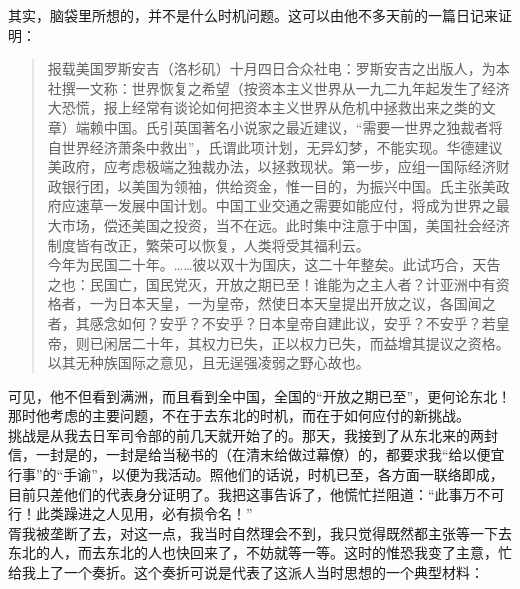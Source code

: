 其实，脑袋里所想的，并不是什么时机问题。这可以由他不多天前的一篇日记来证明：\\

\begin{quote}
	报载美国罗斯安吉（洛杉矶）十月四日合众社电：罗斯安吉之出版人，为本社撰一文称：世界恢复之希望（按资本主义世界从一九二九年起发生了经济大恐慌，报上经常有谈论如何把资本主义世界从危机中拯救出来之类的文章）端赖中国。氏引英国著名小说家之最近建议，“需要一世界之独裁者将自世界经济萧条中救出”，氏谓此项计划，无异幻梦，不能实现。华德建议美政府，应考虑极端之独裁办法，以拯救现状。第一步，应组一国际经济财政银行团，以美国为领袖，供给资金，惟一目的，为振兴中国。氏主张美政府应速草一发展中国计划。中国工业交通之需要如能应付，将成为世界之最大市场，偿还美国之投资，当不在远。此时集中注意于中国，美国社会经济制度皆有改正，繁荣可以恢复，人类将受其福利云。\\

今年为民国二十年。……彼以双十为国庆，这二十年整矣。此试巧合，天告之也：民国亡，国民党灭，开放之期已至！谁能为之主人者？计亚洲中有资格者，一为日本天皇，一为皇帝，然使日本天皇提出开放之议，各国闻之者，其感念如何？安乎？不安乎？日本皇帝自建此议，安乎？不安乎？若皇帝，则已闲居二十年，其权力已失，正以权力已失，而益增其提议之资格。以其无种族国际之意见，且无逞强凌弱之野心故也。\\
\end{quote}

可见，他不但看到满洲，而且看到全中国，全国的“开放之期已至”，更何论东北！那时他考虑的主要问题，不在于去东北的时机，而在于如何应付的新挑战。\\

挑战是从我去日军司令部的前几天就开始了的。那天，我接到了从东北来的两封信，一封是的，一封是给当秘书的（在清末给做过幕僚）的，都要求我“给以便宜行事”的“手谕”，以便为我活动。照他们的话说，时机已至，各方面一联络即成，目前只差他们的代表身分证明了。我把这事告诉了，他慌忙拦阻道：“此事万不可行！此类躁进之人见用，必有损令名！”\\

胥我被垄断了去，对这一点，我当时自然理会不到，我只觉得既然都主张等一下去东北的人，而去东北的人也快回来了，不妨就等一等。这时的惟恐我变了主意，忙给我上了一个奏折。这个奏折可说是代表了这派人当时思想的一个典型材料：\\


